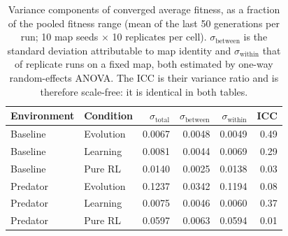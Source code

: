 \begin{table}[t]
  \centering
  \caption{Variance components of converged average fitness, as a fraction of the pooled fitness range (mean of the last 50 generations per run; 10 map seeds $\times$ 10 replicates per cell). $\sigma_{\text{between}}$ is the standard deviation attributable to map identity and $\sigma_{\text{within}}$ that of replicate runs on a fixed map, both estimated by one-way random-effects ANOVA. The ICC is their variance ratio and is therefore scale-free: it is identical in both tables.}
  \label{tab:icc-norm}
  \small
  \setlength{\tabcolsep}{6pt}
  \begin{tabular}{@{}llrrrr@{}}
    \toprule
    Environment & Condition & $\sigma_{\text{total}}$ & $\sigma_{\text{between}}$ & $\sigma_{\text{within}}$ & ICC \\
    \midrule
    Baseline  & Evolution & 0.0067 & 0.0048 & 0.0049 & 0.49 \\
    Baseline  & Learning  & 0.0081 & 0.0044 & 0.0069 & 0.29 \\
    Baseline  & Pure RL   & 0.0140 & 0.0025 & 0.0138 & 0.03 \\
    \midrule
    Predator  & Evolution & 0.1237 & 0.0342 & 0.1194 & 0.08 \\
    Predator  & Learning  & 0.0075 & 0.0046 & 0.0060 & 0.37 \\
    Predator  & Pure RL   & 0.0597 & 0.0063 & 0.0594 & 0.01 \\
    \bottomrule
  \end{tabular}
\end{table}
